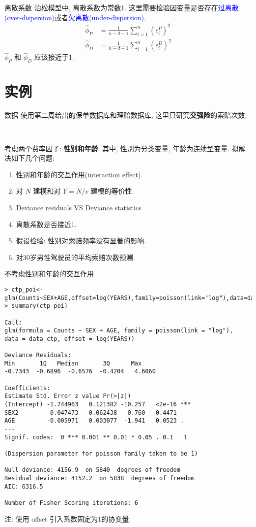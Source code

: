 \documentclass[professionalfont]{beamer}
\newcommand{\blue}[1]{\textcolor{blue}{#1}}
\begin{document}
\begin{frame}{离散系数}
	泊松模型中, 离散系数为常数1. 这里需要检验因变量是否存在\blue{过离散(over-dispersion)}或者\blue{欠离散(under-dispersion)}.
	\begin{equation}
		\begin{aligned}
	\hat{\phi}_P&=\frac{1}{n-d-1}\sum_{i=1}^n\left(\epsilon^P_i\right)^2\\
	\hat{\phi}_D&=\frac{1}{n-d-1}\sum_{i=1}^n\left(\epsilon^D_i\right)^2
	\end{aligned}
	\end{equation}
	$\hat{\phi}_P$ 和 $\hat{\phi}_D$ 应该接近于1.
\end{frame}
\section{实例}
\begin{frame}{数据}
	使用第二周给出的保单数据库和理赔数据库, 这里只研究\textbf{交强险}的索赔次数.
	
	~
	
	考虑两个费率因子: \textbf{性别和年龄}. 其中, 性别为分类变量, 年龄为连续型变量. 拟解决如下几个问题:
	\begin{enumerate}
		\item 性别和年龄的交互作用(interaction effect).
		\item 对 $N$ 建模和对 $Y=N/v$ 建模的等价性.
		\item Deviance residuals VS Deviance statistics 
		\item 离散系数是否接近1.
		\item 假设检验: 性别对索赔频率没有显著的影响.
		\item 对30岁男性驾驶员的平均索赔次数预测.
	\end{enumerate}
	
\end{frame}
\begin{frame}[fragile]{不考虑性别和年龄的交互作用}
	\begin{lstlisting}
> ctp_poi<-glm(Counts~SEX+AGE,offset=log(YEARS),family=poisson(link="log"),data=data_ctp)
> summary(ctp_poi)

Call:
glm(formula = Counts ~ SEX + AGE, family = poisson(link = "log"), 
data = data_ctp, offset = log(YEARS))

Deviance Residuals: 
Min       1Q   Median       3Q      Max  
-0.7343  -0.6896  -0.6576  -0.4204   4.6060  

Coefficients:
Estimate Std. Error z value Pr(>|z|)    
(Intercept) -1.244963   0.121382 -10.257   <2e-16 ***
SEX2         0.047473   0.062438   0.760   0.4471    
AGE         -0.005971   0.003077  -1.941   0.0523 .  
---
Signif. codes:  0 *** 0.001 ** 0.01 * 0.05 . 0.1   1

(Dispersion parameter for poisson family taken to be 1)

Null deviance: 4156.9  on 5840  degrees of freedom
Residual deviance: 4152.2  on 5838  degrees of freedom
AIC: 6316.5

Number of Fisher Scoring iterations: 6
\end{lstlisting}
	
注: 使用 offset 引入系数固定为1的协变量.
\end{frame}
\end{document}
